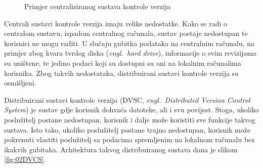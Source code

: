 \begin{figure}[h]

    \caption{Primjer centraliziranog sustava kontrole verzija}%
    \label{fig:02CVCS}
\end{figure}

Centrali sustavi kontrole verzija imaju velike nedostatke. Kako se radi o centralom sustavu, ispadom
centralnog računala, sustav postaje nedostupan te korisnici ne mogu raditi. U slučaju gubitka
podataka na centralnim računalu, na primjer zbog kvara tvrdog diska (\textit{engl.~hard drive}),
informacije o svim revizijama su uništene, te jedino podaci koji su dostupni su oni na lokalnim
računalima korisnika. Zbog takvih nedostataka, distribuirani sustavi kontrole verzija su osmišljeni.

Distribuirani sustavi kontrole verzija (DVSC, \textit{engl.~Distributed Version Control System}) je
sustav gdje korisnik dohvaća datoteke, ali i svu povijest. Stoga, ukoliko poslužitelj postane
nedostupan, korisnik i dalje može koristiti sve funkcije takvog sustava. Isto tako, ukoliko
poslužitelj postane trajno nedostupan, korisnik može pokrenuti vlastiti poslužitelj sa podacima
spremljenim na lokalnom računalu bez ikakvih gubitaka. Arhitektura takvog distribuiranog sustava
dana je slikom \ref{fig:02DVCS}.

